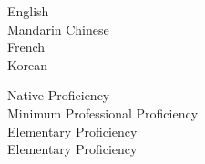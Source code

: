\begin{minipage}[t]{0.8\textwidth}
  \vspace*{8pt}

  {
    \begin{minipage}[t]{0.40\textwidth}
      English\\
      Mandarin Chinese\\
      French\\
      Korean
    \end{minipage}
    \begin{minipage}[t]{0.50\textwidth}
      Native Proficiency\\
      Minimum Professional Proficiency\\
      Elementary Proficiency\\
      Elementary Proficiency
    \end{minipage}
  }
\end{minipage}

\vspace*{8pt}
